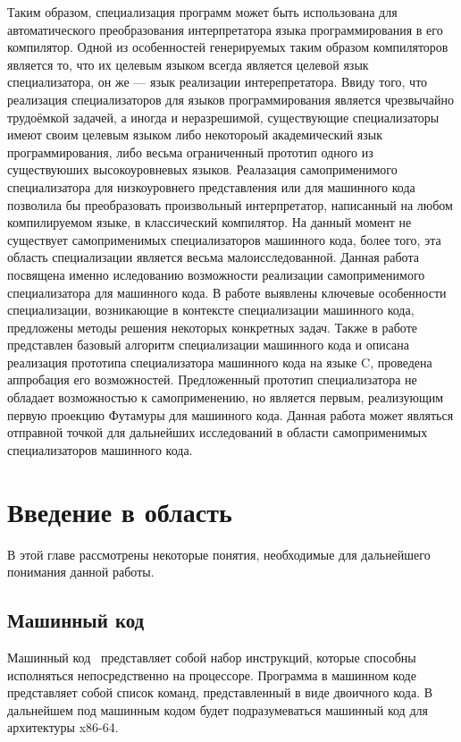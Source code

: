Таким образом, специализация программ может быть использована для автоматического преобразования
интерпретатора языка программирования в его компилятор.
Одной из особенностей генерируемых таким образом компиляторов является то, что их целевым языком
всегда является целевой язык специализатора, он же --- язык реализации интерепретатора.
Ввиду того, что реализация специализаторов для языков программирования является чрезвычайно трудоёмкой
задачей, а иногда и неразрешимой, существующие специализаторы имеют своим целевым языком либо
некотороый академический язык программирования, либо весьма ограниченный прототип одного из существуюших
высокоуровневых языков.
Реалазация самоприменимого специализатора для низкоуровнего представления или для машинного кода
позволила бы преобразовать произвольный интерпретатор, написанный на любом компилируемом языке, в
классический компилятор.
На данный момент не существует самоприменимых специализаторов машинного кода,
более того, эта область специализации является весьма малоисследованной.
Данная работа посвящена именно иследованию возможности реализации самоприменимого специализатора для
машинного кода.
В работе выявлены ключевые особенности специализации, возникающие в контексте специализации машинного
кода, предложены методы решения некоторых конкретных задач.
Также в работе представлен базовый алгоритм специализации машинного кода и
описана реализация прототипа специализатора машинного кода на языке \textsf{C},
проведена аппробация его возможностей.
Предложенный прототип специализатора не обладает возможностью к самоприменению,
но является первым, реализующим первую проекцию Футамуры для машинного кода.
Данная работа может являться отправной точкой для дальнейших исследований в области самоприменимых
специализаторов машинного кода.


\section{ Введение в область}
В этой главе рассмотрены некоторые понятия, необходимые для дальнейшего понимания данной работы.

\subsection{ Машинный код}
Машинный код~\cite{AMD} представляет собой набор инструкций, которые способны исполняться непосредственно на процессоре. Программа в машинном коде представляет собой список команд, представленный в виде двоичного кода. В дальнейшем под машинным кодом будет подразумеваться машинный код для архитектуры x86-64.

